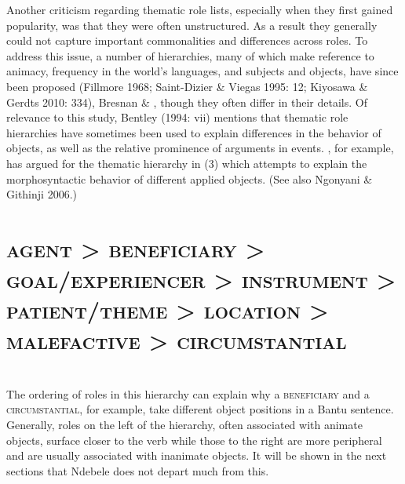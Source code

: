 Another criticism regarding thematic role lists, especially when they first gained popularity, was that they were often unstructured. As a result they generally could not capture important commonalities and differences across roles. To address this issue, a number of hierarchies, many of which make reference to animacy, frequency in the world’s languages, and subjects and objects, have since been proposed (Fillmore 1968; Saint-Dizier \& Viegas 1995: 12; Kiyosawa \& Gerdts 2010: 334), Bresnan \& \citet{Kanerva1989}, though they often differ in their details. Of relevance to this study, Bentley (1994: vii) mentions that thematic role hierarchies have sometimes been used to explain differences in the behavior of objects, as well as the relative prominence of arguments in events. \citet[129]{Mchombo2004}, for example, has argued for the thematic hierarchy in (3) which attempts to explain the morphosyntactic behavior of different applied objects. (See also Ngonyani \& Githinji 2006.)

\chapter[agent {\textgreater} beneficiary {\textgreater} goal/experiencer {\textgreater} instrument {\textgreater} patient/theme {\textgreater}   location {\textgreater} malefactive {\textgreater} circumstantial]{\textsc{agent {\textgreater} beneficiary {\textgreater} goal/experiencer {\textgreater} instrument {\textgreater} patient/theme {\textgreater}   location {\textgreater} malefactive {\textgreater} circumstantial}}
\chapter[ ]{ }

The ordering of roles in this hierarchy can explain why a \textsc{beneficiary} and a \textsc{circumstantial}, for example, take different object positions in a Bantu sentence. Generally, roles on the left of the hierarchy, often associated with animate objects, surface closer to the verb while those to the right are more peripheral and are usually associated with inanimate objects. It will be shown in the next sections that Ndebele does not depart much from this.

